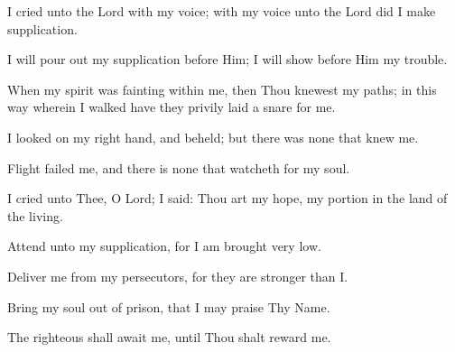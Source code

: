 I cried unto the Lord with my voice; with my voice unto the Lord did I make supplication.

I will pour out my supplication before Him; I will show before Him my trouble.

When my spirit was fainting within me, then Thou knewest my paths; in this way wherein I walked have they privily laid a snare for me.

I looked on my right hand, and beheld; but there was none that knew me.

Flight failed me, and there is none that watcheth for my soul.

I cried unto Thee, O Lord; I said: Thou art my hope, my portion in the land of the living.

Attend unto my supplication, for I am brought very low.

Deliver me from my persecutors, for they are stronger than I.

Bring my soul out of prison, that I may praise Thy Name.

The righteous shall await me, until Thou shalt reward me.
